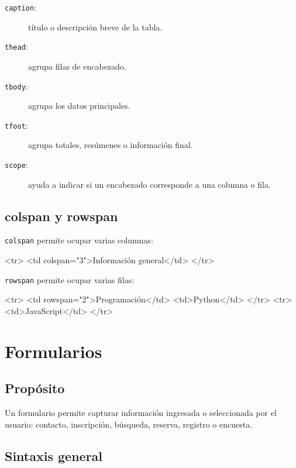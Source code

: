 \documentclass[11pt]{article}
\begin{document}
\begin{description}
    \item[\texttt{caption}:] título o descripción breve de la tabla.
    \item[\texttt{thead}:] agrupa filas de encabezado.
    \item[\texttt{tbody}:] agrupa los datos principales.
    \item[\texttt{tfoot}:] agrupa totales, resúmenes o información final.
    \item[\texttt{scope}:] ayuda a indicar si un encabezado corresponde a una columna o fila.
\end{description}

\subsection{colspan y rowspan}

\texttt{colspan} permite ocupar varias columnas:

\begin{htmlcodedark}
    <tr>
    <td colspan="3">Información general</td>
    </tr>
\end{htmlcodedark}

\texttt{rowspan} permite ocupar varias filas:

\begin{htmlcodedark}
    <tr>
    <td rowspan="2">Programación</td>
    <td>Python</td>
    </tr>
    <tr>
    <td>JavaScript</td>
    </tr>
\end{htmlcodedark}


\section{Formularios}

\subsection{Propósito}

Un formulario permite capturar información ingresada o seleccionada por el usuario: contacto, inscripción,
búsqueda, reserva, registro o encuesta.

\subsection{Sintaxis general}
\end{document}

